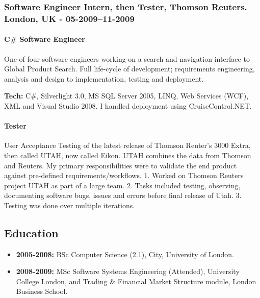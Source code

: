 \documentclass[
  a4paper,
]{article}
\providecommand{\tightlist}{%
  \setlength{\itemsep}{0pt}\setlength{\parskip}{0pt}}
\begin{document}
\begin{multicols*}{2}
\hypertarget{software-engineer-intern-then-tester-thomson-reuters.-london-uk---05-200911-2009}{%
\subsubsection{Software Engineer Intern, then Tester, Thomson Reuters.
London, UK -
05-2009--11-2009}\label{software-engineer-intern-then-tester-thomson-reuters.-london-uk---05-200911-2009}}

\hypertarget{c-software-engineer}{%
\paragraph{C\# Software Engineer}\label{c-software-engineer}}

One of four software engineers working on a search and navigation
interface to Global Product Search. Full life-cycle of development;
requirements engineering, analysis and design to implementation, testing
and deployment.

\textbf{Tech:} C\#, Silverlight 3.0, MS SQL Server 2005, LINQ, Web
Services (WCF), XML and Visual Studio 2008. I handled deployment using
CruiseControl.NET.

\hypertarget{tester}{%
\paragraph{Tester}\label{tester}}

User Acceptance Testing of the latest release of Thomson Reuter's 3000
Extra, then called UTAH, now called Eikon. UTAH combines the data from
Thomson and Reuters. My primary responsibilities were to validate the
end product against pre-defined requirements/workflows. 1. Worked on
Thomson Reuters project UTAH as part of a large team. 2. Tasks included
testing, observing, documenting software bugs, issues and errors before
final release of Utah. 3. Testing was done over multiple iterations.

\hypertarget{education}{%
\subsection{Education}\label{education}}

\begin{itemize}
\tightlist
\item
  \textbf{2005-2008:} BSc Computer Science (2.1), City, University of
  London.
\item
  \textbf{2008-2009:} MSc Software Systems Engineering (Attended),
  University College London, and Trading \& Financial Market Structure
  module, London Business School.
\end{itemize}


\end{multicols*}
\end{document}
